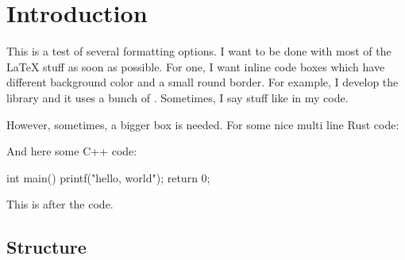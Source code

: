 \chapter{Introduction}

This is a test of several formatting options. I want to be done with most of the LaTeX stuff as soon as possible. For one, I want inline code boxes which have different background color and a small round border. For example, I develop the library  and it uses a bunch of . Sometimes, I say stuff like  in my code.

However, sometimes, a bigger box is needed. For some nice multi line Rust code:


And here some C++ code:

\begin{cppcode}
int main() {
printf("hello, world");
return 0;
}
\end{cppcode}

This is after the code.

\section{Structure}

\lipsum[1]
